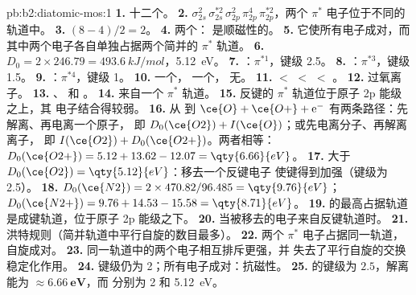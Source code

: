 \begin{solution}{pb:b2:diatomic-mos:1}
\textbf{1.} 十二个。
\textbf{2.} $\sigma_{2s}^2\,\sigma_{2s}^{*2}\,\sigma_{2p}^2\,\pi_{2p}^4\,\pi_{2p}^{*2}$，两个 $\pi^*$
电子位于不同的轨道中。
\textbf{3.} $(8 - 4)/2 = 2$。
\textbf{4.} 两个： 是顺磁性的。
\textbf{5.} 它使所有电子成对，而其中两个电子各自单独占据两个简并的
$\pi^*$ 轨道。
\textbf{6.} $D_0 = 2 \times 246.79 = \qty{493.6}{kJ/mol}$，\qty{5.12}{eV}。
\textbf{7.} ：$\pi^{*1}$，键级 2.5。
\textbf{8.} ：$\pi^{*3}$，键级 1.5。
\textbf{9.} ：$\pi^{*4}$，键级 1。
\textbf{10.}  一个， 一个， 无。
\textbf{11.}  $<$  $<$  $<$ 。
\textbf{12.} 过氧离子。
\textbf{13.} 、 和 。
\textbf{14.} 来自一个 $\pi^*$ 轨道。
\textbf{15.} 反键的 $\pi^*$ 轨道位于原子 2p 能级之上，其
电子结合得较弱。
\textbf{16.} 从  到 $\ce{O} + \ce{O+} + \mathrm e^-$ 有两条路径：先解离、再电离一个原子，
即 $D_0(\ce{O2}) + I(\ce{O})$；或先电离分子、再解离离子，
即 $I(\ce{O2}) + D_0(\ce{O2+})$。两者相等：$D_0(\ce{O2+}) = 5.12 + 13.62 - 12.07 = \qty{6.66}{eV}$。
\textbf{17.} 大于 $D_0(\ce{O2}) = \qty{5.12}{eV}$：移去一个反键电子
使键得到加强（键级为 2.5）。
\textbf{18.} $D_0(\ce{N2}) = 2 \times 470.82/96.485 = \qty{9.76}{eV}$；$D_0(\ce{N2+}) = 9.76 +
14.53 - 15.58 = \qty{8.71}{eV}$。
\textbf{19.}  的最高占据轨道是成键轨道，位于原子
2p 能级之下。
\textbf{20.} 当被移去的电子来自反键轨道时。
\textbf{21.} 洪特规则（简并轨道中平行自旋的数目最多）。
\textbf{22.} 两个 $\pi^*$ 电子占据同一轨道，自旋成对。
\textbf{23.} 同一轨道中的两个电子相互排斥更强，并
失去了平行自旋的交换稳定化作用。
\textbf{24.} 键级仍为 2；所有电子成对：抗磁性。
\textbf{25.}  的键级为 $\boldsymbol{2.5}$，解离能为
$\boldsymbol{\approx \qty{6.66}{eV}}$，而  分别为 2 和 \qty{5.12}{eV}。
\end{solution}
